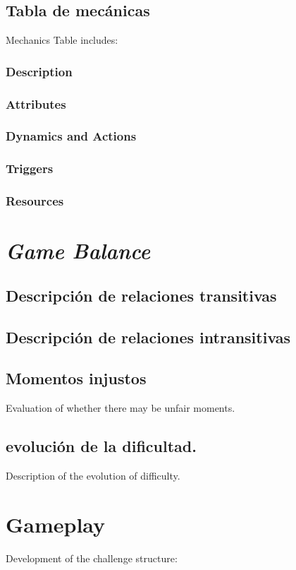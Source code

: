     \subsection{Tabla de mecánicas}
    Mechanics Table includes:
        \subsubsection{Description}
        \subsubsection{Attributes}
        \subsubsection{Dynamics and Actions}
        \subsubsection{Triggers}
        \subsubsection{Resources}

\section{\textit{Game Balance}}
    \subsection{Descripción de relaciones transitivas}
    \subsection{Descripción de relaciones intransitivas}
    \subsection{Momentos injustos}
    Evaluation of whether there may be unfair moments.
    \subsection{ evolución de la dificultad.}
    Description of the evolution of difficulty.

\section{Gameplay}
Development of the challenge structure:

